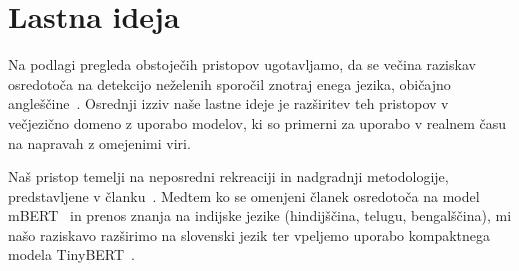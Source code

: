 \documentclass[sigconf,nonacm]{acmart}
\begin{document}


\section{Lastna ideja}

Na podlagi pregleda obstoječih pristopov ugotavljamo, da se večina raziskav osredotoča na detekcijo neželenih 
sporočil znotraj enega jezika, običajno angleščine~\cite{sethi2017}. Osrednji izziv naše lastne ideje je 
razširitev teh pristopov v večjezično domeno z uporabo modelov, ki so primerni za uporabo v realnem času 
na napravah z omejenimi viri. 

Naš pristop temelji na neposredni rekreaciji in nadgradnji metodologije, predstavljene v članku~\cite{inturi2025}. 
Medtem ko se omenjeni članek osredotoča na model mBERT~\cite{devlin2019} in prenos znanja na indijske jezike 
(hindijščina, telugu, bengalščina), mi našo raziskavo razširimo na slovenski jezik ter vpeljemo uporabo 
kompaktnega modela TinyBERT~\cite{jiao-etal-2020-tinybert}.
\end{document}
